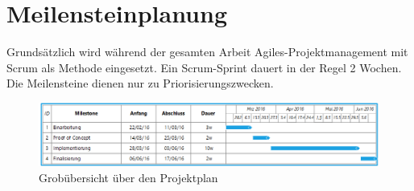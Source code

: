 \section{Meilensteinplanung}
Grundsätzlich wird während der gesamten Arbeit Agiles-Projektmanagement mit Scrum als Methode eingesetzt. Ein Scrum-Sprint dauert in der Regel 2 Wochen. Die Meilensteine dienen nur zu Priorisierungszwecken.

\begin{figure}[ht]
	\centering
	\includegraphics[width=\textwidth]{images/projplan.png}
	\caption{Grobübersicht über den Projektplan}
	\label{Risk result}
\end{figure}

